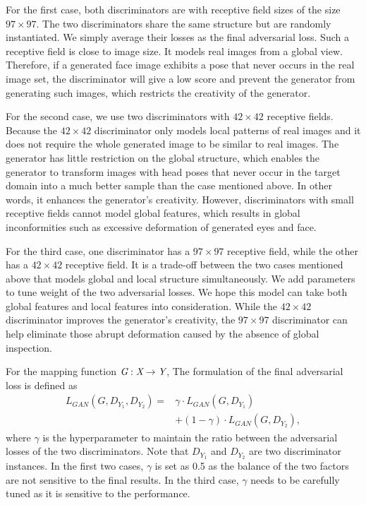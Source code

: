 \documentclass[letterpaper]{article} %
\begin{document}
	For the first case, both discriminators are with  receptive field sizes of the size $97\times97$. The two discriminators share the same structure but are randomly instantiated. We simply average their losses as the final adversarial loss.  Such a receptive field is close to image size. It models real images from a global view. Therefore, if a generated face image exhibits a pose that never occurs in the real image set, the discriminator will give a low score and prevent the generator from generating such images, which restricts the creativity of the generator.
	
	For the second case, we use two discriminators with $42\times42$ receptive fields. Because the $42\times42$ discriminator only models local patterns of real images and it does not require the whole generated image to be similar to real images. The generator has little restriction on the global structure, which enables the generator to transform images with head poses that never occur in the target domain into a much better sample than the case mentioned above. In other words, it enhances the generator's creativity. However, discriminators with small receptive fields cannot model global features, which results in global inconformities such as excessive deformation of generated eyes and face.  
	
	For the third case, one discriminator has a $97\times97$ receptive field, while the other has a $42\times42$ receptive field. It is a trade-off between the two cases mentioned above that models global and local structure simultaneously. We add parameters to tune weight of the two adversarial losses. We hope this model can take both global features and local features into consideration. While the $42\times42$ discriminator improves the generator's creativity, the $97\times97$ discriminator can help eliminate those abrupt deformation caused by the absence of global inspection.
	
	For the mapping function $ \emph{G} : \emph{X} \rightarrow \emph{Y} $, The formulation of the final adversarial loss is defined as
	\begin{align}
	L_{GAN}(G,D_{Y_1},D_{Y_2}) =& \gamma \cdot L_{GAN}(G,D_{Y_1})\nonumber\\&+(1-\gamma)\cdot L_{GAN}(G,D_{Y_2}),
	\end{align}
	where $\gamma$ is the hyperparameter to maintain the ratio between the adversarial losses of the two discriminators.
	Note that $D_{Y_1}$ and $D_{Y_2}$ are two discriminator instances. In the first two cases, $\gamma$ is set as 0.5 as the balance of the two factors are not sensitive to the final results. In the third case, $\gamma$ needs to be carefully tuned as it is sensitive to the performance.
	
\end{document}
